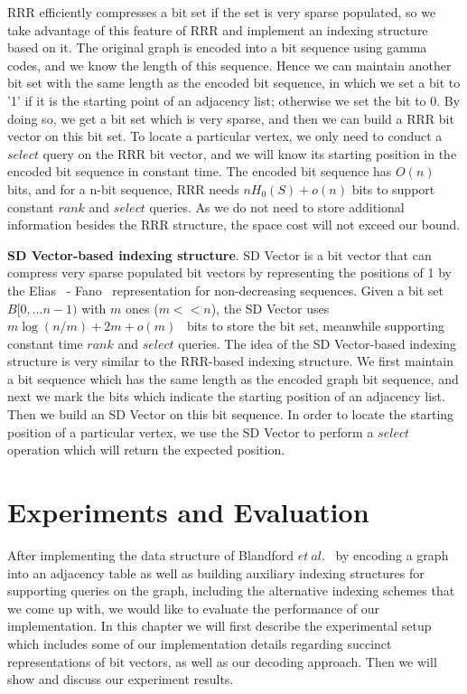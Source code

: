 \documentclass[12pt,glossary]{dalthesis}
\begin{document}
\bigskip
\bigskip

RRR efficiently compresses a bit set if the set is very sparse populated, so we take advantage of this feature of RRR and implement an indexing structure based on it. The original graph is encoded into a bit sequence using gamma codes, and we know the length of this sequence. Hence we can maintain another bit set with the same length as the encoded bit sequence, in which we set a bit to '1' if it is the starting point of an adjacency list; otherwise we set the bit to 0. By doing so, we get a bit set which is very sparse, and then we can build a RRR bit vector on this bit set. To locate a particular vertex, we only need to conduct a $select$ query on the RRR bit vector, and we will know its starting position in the encoded bit sequence in constant time. The encoded bit sequence has $O(n)$ bits, and for a n-bit sequence, RRR needs $nH_{0}(S)+o(n)$ bits to support constant $rank$ and $select$ queries. As we do not need to store additional information besides the RRR structure, the space cost will not exceed our bound. 

\bigskip
\bigskip

\textbf{SD Vector-based indexing structure}. SD Vector is a bit vector that can compress very sparse populated bit vectors by representing the positions of 1 by the Elias~\cite{Elias} - Fano~\cite{Fano} representation for non-decreasing sequences. Given a bit set $B[0,...n-1)$ with $m$ ones ($m << n$),   the SD Vector uses $m \log (n/m)  + 2m + o(m)$~\cite{SD-vector} bits to store the bit set, meanwhile supporting constant time $rank$ and $select$ queries. The idea of the SD Vector-based indexing structure is very similar to the RRR-based indexing structure. We first maintain a bit sequence which has the same length as the encoded graph bit sequence, and next we mark the bits which indicate the starting position of an adjacency list. Then we build an SD Vector on this bit sequence. In order to locate the starting position of a particular vertex, we use the SD Vector to perform a $select$ operation which will return the expected position. 


\chapter{Experiments and Evaluation}
After implementing the data structure of Blandford $et \ al.$~\cite{compact-representation} by encoding a graph into an adjacency table as well as building auxiliary indexing structures for supporting queries on the graph, including the alternative indexing schemes that we come up with, we would like to evaluate the performance of our implementation. In this chapter we will first describe the experimental setup which includes some of our implementation details regarding succinct representations of bit vectors, as well as our decoding approach. Then we will show and discuss our experiment results.
\end{document}
